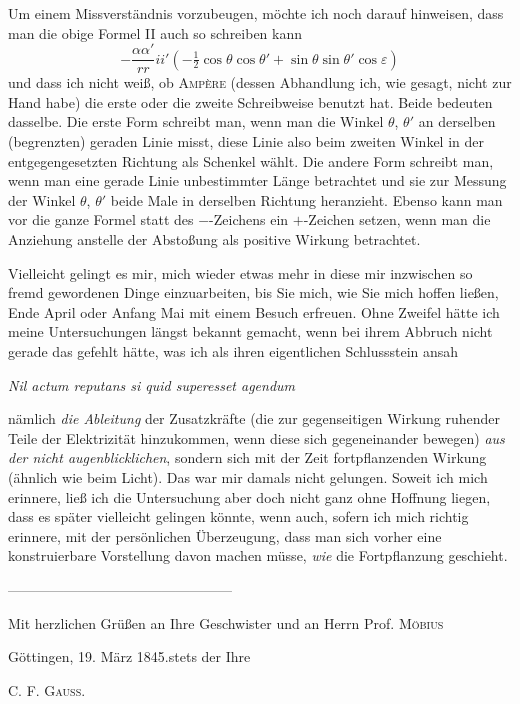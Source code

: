 Um einem Missverständnis vorzubeugen, möchte ich noch darauf hinweisen, dass man die obige Formel II auch so schreiben kann
\[
-\frac{\alpha\alpha'}{rr}ii'\left(-\tfrac12\cos\theta\cos\theta'+\sin\theta\sin\theta'\cos\varepsilon\right)
\]
und dass ich nicht weiß, ob \textsc{Ampère} (dessen Abhandlung ich, wie gesagt, nicht zur Hand habe) die erste oder die zweite Schreibweise benutzt hat. Beide bedeuten dasselbe. Die erste Form schreibt man, wenn man die Winkel $\theta$, $\theta'$ an derselben (begrenzten) geraden Linie misst, diese Linie also beim zweiten Winkel in der entgegengesetzten Richtung als Schenkel wählt. Die andere Form schreibt man, wenn man eine gerade Linie unbestimmter Länge betrachtet und sie zur Messung der Winkel $\theta$, $\theta'$ beide Male in derselben Richtung heranzieht. Ebenso kann man vor die ganze Formel statt des $-$-Zeichens ein $+$-Zeichen setzen, wenn man die Anziehung anstelle der Abstoßung als positive Wirkung betrachtet.

Vielleicht gelingt es mir, mich wieder etwas mehr in diese mir inzwischen so fremd gewordenen Dinge einzuarbeiten, bis Sie mich, wie Sie mich hoffen ließen, Ende April oder Anfang Mai mit einem Besuch erfreuen. Ohne Zweifel hätte ich meine Untersuchungen längst bekannt gemacht, wenn bei ihrem Abbruch nicht gerade das gefehlt hätte, was ich als ihren eigentlichen Schlussstein ansah
\begin{center}\textit{Nil actum reputans si quid superesset agendum}\end{center}
nämlich \textit{die Ableitung} der Zusatzkräfte (die zur gegenseitigen Wirkung ruhender Teile der Elektrizität hinzukommen, wenn diese sich gegeneinander bewegen) \textit{aus der nicht augenblicklichen}, sondern sich mit der Zeit fortpflanzenden Wirkung (ähnlich wie beim Licht). Das war mir damals nicht gelungen. Soweit ich mich erinnere, ließ ich die Untersuchung aber doch nicht ganz ohne Hoffnung liegen, dass es später vielleicht gelingen könnte, wenn auch, sofern ich mich richtig erinnere, mit der persönlichen Überzeugung, dass man sich vorher eine konstruierbare Vorstellung davon machen müsse, \textit{wie} die Fortpflanzung geschieht.
\begin{center}—\quad —\quad —\quad —\quad —\quad —\quad —\quad —\quad —\quad —\quad —\quad —\quad —\quad —\quad —\quad —\end{center}
\noindent\begin{minipage}{\linewidth}
Mit herzlichen Grüßen an Ihre Geschwister und an Herrn Prof. \textsc{Möbius}

Göttingen, 19. März 1845.\hfill stets der Ihre
\begin{flushright}C. F. \textsc{Gauss}.\end{flushright}
\end{minipage}

